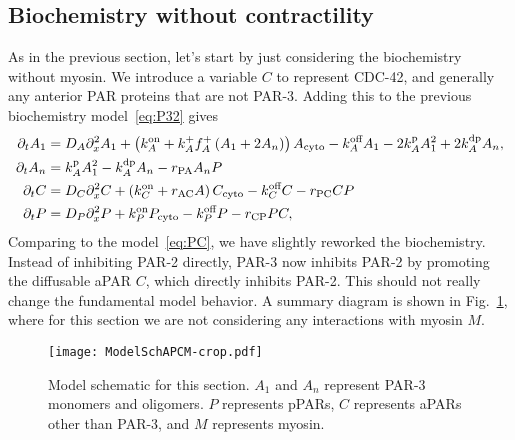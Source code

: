 \documentclass[11pt]{article}
\newcommand{\6}[1]{#1_{\text{6}}}
\newcommand{\3}[1]{#1_{\text{3}}}
\newcommand{\A}[1]{#1_A}
\begin{document}
\subsection{Biochemistry without contractility}
As in the previous section, let's start by just considering the biochemistry without myosin. We introduce a variable $C$ to represent CDC-42, and generally any anterior PAR proteins that are not PAR-3. Adding this to the previous biochemistry model\ \eqref{eq:P32} gives 
\begin{subequations}
\label{eq:PC}
\begin{align}
\Dt A_1 &= D_A \Dx^2 A_1 +\left( \kon_A +\A{\kf}\A{f}^+\left(\MA+2\PA\right)\right) A_\text{cyto} - \koff_A \MA -2\kp_A \MA^2+2\kdp_A \PA,\\
\Dt \PA &= \kp_A \MA^2 - \kdp_A \PA-r_\text{PA} \PA P\\
\Dt C &= D_C \Dx^2 C + \left(\kon_C+r_\text{AC} A\right) C_\text{cyto}-\koff_C C-r_\text{PC} CP\\
\Dt P &= D_P \Dx^2 P + \kon_P P_\text{cyto} - \koff_P P -r_\text{CP} P C,%
\end{align}
\end{subequations}
Comparing to the model\ \eqref{eq:PC}, we have slightly reworked the biochemistry. Instead of inhibiting PAR-2 directly, PAR-3 now inhibits PAR-2 by promoting the diffusable aPAR $C$, which directly inhibits PAR-2. This should not really change the fundamental model behavior. A summary diagram is shown in Fig.\ \ref{fig:SchAPCM}, where for this section we are not considering any interactions with myosin $M$.

\begin{figure}
\centering
\texttt{[image: ModelSchAPCM-crop.pdf]}
\caption{\label{fig:SchAPCM}Model schematic for this section. $A_1$ and $A_n$ represent PAR-3 monomers and oligomers. $P$ represents pPARs, $C$ represents aPARs other than PAR-3, and $M$ represents myosin.}
\end{figure}
\end{document}
